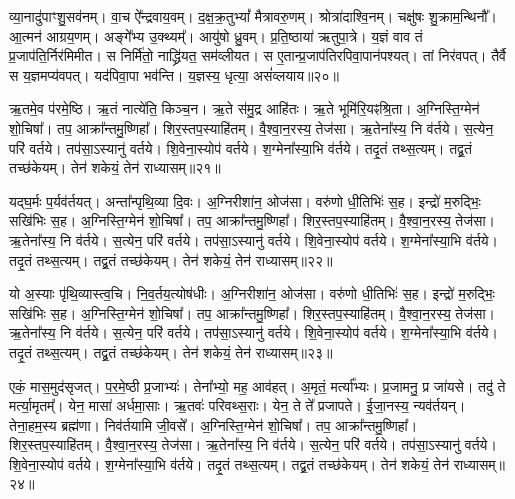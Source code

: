 व्या॒नादु॑पाꣳशु॒सव॑नम्।
वा॒च ऐ᳚न्द्रवाय॒वम्।
द॒क्ष॒क्र॒तुभ्यां᳚ मैत्रावरु॒णम्।
श्रोत्रा॑दाश्वि॒नम्।
चक्षु॑षः शु॒क्राम॒न्थिनौ᳚।
आ॒त्मन॑ आग्रय॒णम्।
अङ्गे᳚भ्य उ॒क्थ्यम्᳚।
आयु॑षो ध्रु॒वम्।
प्र॒ति॒ष्ठाया॑ ऋतुपा॒त्रे।
य॒ज्ञं वाव तं प्र॒जा\-प॑ति॒र्निर॑मिमीत।
स निर्मि॑तो॒ नाद्ध्रि॑यत॒ सम॑व्लीयत।
स ए॒तान्प्र॒जा\-प॑तिरपिवा॒पान॑पश्यत्।
तां निर॑वपत्।
तैर्वै स य॒ज्ञमप्य॑वपत्।
यद॑पिवा॒पा भव॑न्ति।
य॒ज्ञस्य॒ धृत्या॒ असं॑व्लयाय॥२०॥\anuvakamend[उ॒पा॒ꣳ॒श्व॒न्त॒र्या॒मौ निर॑मिमीतामिमीत॒ षट्च॑]

ऋ॒तमे॒व प॑रमे॒ष्ठि।
ऋ॒तं नात्ये॑ति॒ किञ्च॒न।
ऋ॒ते स॑मु॒द्र आहि॑तः।
ऋ॒ते भूमि॑रि॒यꣴश्रि॒ता।
अ॒ग्निस्ति॒ग्मेन॑ शो॒चिषा᳚।
तप॒ आक्रा᳚न्तमु॒ष्णिहा᳚।
शिर॒स्तप॒स्याहि॑तम्।
वै॒श्वा॒न॒रस्य॒ तेज॑सा।
ऋ॒तेना᳚स्य॒ नि व॑र्तये।
स॒त्येन॒ परि॑ वर्तये।
तप॑सा॒\-ऽस्यानु॑ वर्तये।
शि॒वेना॒स्योप॑ वर्तये।
श॒ग्मेना᳚स्या॒भि व॑र्तये।
तदृ॒तं तथ्स॒त्यम्।
तद्व्र॒तं तच्छ॑केयम्।
तेन॑ शकेयं॒ तेन॑ राध्यासम्॥२१॥

यद्\mbox{}घ॒र्मः प॒र्यव॑र्तयत्।
अन्ता᳚न्पृथि॒व्या दि॒वः।
अ॒ग्निरीशा॑न॒ ओज॑सा।
वरु॑णो धी॒तिभिः॑ स॒ह।
इन्द्रो॑ म॒रुद्भिः॒ सखि॑भिः स॒ह।
अ॒ग्निस्ति॒ग्मेन॑ शो॒चिषा᳚।
तप॒ आक्रा᳚न्तमु॒ष्णिहा᳚।
शिर॒स्तप॒स्याहि॑तम्।
वै॒श्वा॒न॒रस्य॒ तेज॑सा।
ऋ॒तेना᳚स्य॒ नि व॑र्तये।
स॒त्येन॒ परि॑ वर्तये।
तप॑सा॒\-ऽस्यानु॑ वर्तये।
शि॒वेना॒स्योप॑ वर्तये।
श॒ग्मेना᳚स्या॒भि व॑र्तये।
तदृ॒तं तथ्स॒त्यम्।
तद्व्र॒तं तच्छ॑केयम्।
तेन॑ शकेयं॒ तेन॑ राध्यासम्॥२२॥

यो अ॒स्याः पृ॑थि॒व्यास्त्व॒चि।
नि॒व॒र्तय॒त्योष॑धीः।
अ॒ग्निरीशा॑न॒ ओज॑सा।
वरु॑णो धी॒तिभिः॑ स॒ह।
इन्द्रो॑ म॒रुद्भिः॒ सखि॑भिः स॒ह।
अ॒ग्निस्ति॒ग्मेन॑ शो॒चिषा᳚।
तप॒ आक्रा᳚न्तमु॒ष्णिहा᳚।
शिर॒स्तप॒स्याहि॑तम्।
वै॒श्वा॒न॒रस्य॒ तेज॑सा।
ऋ॒तेना᳚स्य॒ नि व॑र्तये।
स॒त्येन॒ परि॑ वर्तये।
तप॑सा॒\-ऽस्यानु॑ वर्तये।
शि॒वेना॒स्योप॑ वर्तये।
श॒ग्मेना᳚स्या॒भि व॑र्तये।
तदृ॒तं तथ्स॒त्यम्।
तद्व्र॒तं तच्छ॑केयम्।
तेन॑ शकेयं॒ तेन॑ राध्यासम्॥२३॥

एकं॒ मास॒मुद॑\-सृजत्।
प॒र॒मे॒ष्ठी प्र॒जाभ्यः॑।
तेना᳚भ्यो॒ मह॒ आव॑हत्।
अ॒मृतं॒ मर्त्या᳚भ्यः।
प्र॒जामनु॒ प्र जा॑यसे।
तदु॑ ते मर्त्या॒मृतम्᳚।
येन॒ मासा॑ अर्धमा॒साः।
ऋ॒तवः॑ परिवथ्स॒राः।
येन॒ ते ते᳚ प्रजापते।
ई॒जा॒नस्य॒ न्यव॑र्तयन्।
तेना॒हम॒स्य ब्रह्म॑णा।
निव॑र्तयामि जी॒वसे᳚।
अ॒ग्निस्ति॒ग्मेन॑ शो॒चिषा᳚।
तप॒ आक्रा᳚न्तमु॒ष्णिहा᳚।
शिर॒स्तप॒स्याहि॑तम्।
वै॒श्वा॒न॒रस्य॒ तेज॑सा।
ऋ॒तेना᳚स्य॒ नि व॑र्तये।
स॒त्येन॒ परि॑ वर्तये।
तप॑सा॒\-ऽस्यानु॑ वर्तये।
शि॒वेना॒स्योप॑ वर्तये।
श॒ग्मेना᳚स्या॒भि व॑र्तये।
तदृ॒तं तथ्स॒त्यम्।
तद्व्र॒तं तच्छ॑केयम्।
तेन॑ शकेयं॒ तेन॑ राध्यासम्॥२४॥

